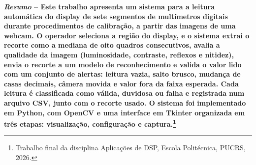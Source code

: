 \documentclass[10pt,twocolumn,letterpaper]{article}
\begin{document}

{\fontsize{9}{11}\selectfont\bfseries
\noindent\textit{Resumo} -- Este trabalho apresenta um sistema para a leitura
automática do display de sete segmentos de multímetros digitais durante
procedimentos de calibração, a partir das imagens de uma webcam. O operador
seleciona a região do display, e o sistema extrai o recorte como a mediana de
oito quadros consecutivos, avalia a qualidade da imagem (luminosidade,
contraste, reflexos e nitidez), envia o recorte a um modelo de reconhecimento
e valida o valor lido com um conjunto de alertas: leitura vazia, salto brusco,
mudança de casas decimais, câmera movida e valor fora da faixa esperada. Cada
leitura é classificada como válida, duvidosa ou falha e registrada num arquivo
CSV, junto com o recorte usado. O sistema foi implementado em Python, com
OpenCV e uma interface em Tkinter organizada em três etapas: visualização,
configuração e captura.\footnote{Trabalho final da disciplina Aplicações de
DSP, Escola Politécnica, PUCRS, 2026.}\par}
\end{document}
